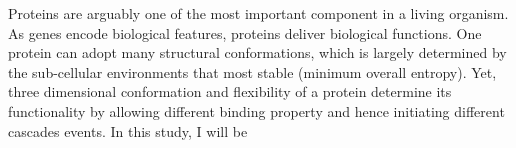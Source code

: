 Proteins are arguably one of the most important component in a living organism. As genes encode biological features, proteins deliver biological functions. One protein can adopt many structural conformations, which is largely determined by the sub-cellular environments that  most stable (minimum overall entropy). Yet, three dimensional conformation and flexibility of a protein determine its functionality by allowing different binding property and hence initiating different cascades events. In this study, I will be 